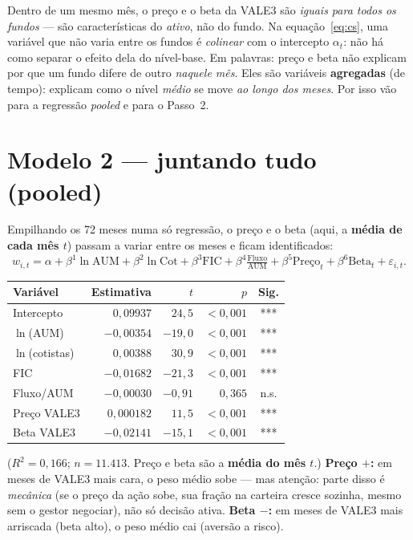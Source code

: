 \documentclass[11pt]{article}
\begin{document}
Dentro de um mesmo mês, o preço e o beta da VALE3 são \emph{iguais para todos os
fundos} --- são características do \emph{ativo}, não do fundo. Na
equação~\eqref{eq:cs}, uma variável que não varia entre os fundos é
\emph{colinear} com o intercepto $\alpha_t$: não há como separar o efeito dela do
nível-base. Em palavras: preço e beta não explicam por que um fundo difere de outro
\emph{naquele mês}. Eles são variáveis \textbf{agregadas} (de tempo): explicam como o
nível \emph{médio} se move \emph{ao longo dos meses}. Por isso vão para a regressão
\emph{pooled} e para o Passo~2.

\section{Modelo 2 --- juntando tudo (pooled)}

Empilhando os 72 meses numa só regressão, o preço e o beta (aqui, a \textbf{média de
cada mês $t$}) passam a variar entre os meses e ficam identificados:
\begin{equation}
w_{i,t} = \alpha + \beta^{1}\ln\text{AUM} + \beta^{2}\ln\text{Cot}
+ \beta^{3}\text{FIC} + \beta^{4}\tfrac{\text{Fluxo}}{\text{AUM}}
+ \beta^{5}\text{Preço}_t + \beta^{6}\text{Beta}_t + \varepsilon_{i,t}.
\label{eq:pool}
\end{equation}

\begin{table}[h]\centering
\begin{tabular}{@{}lrrrc@{}}
\toprule
Variável & Estimativa & $t$ & $p$ & Sig. \\
\midrule
Intercepto       & $0{,}09937$  & $24{,}5$   & $<0{,}001$ & *** \\
$\ln$(AUM)       & $-0{,}00354$ & $-19{,}0$  & $<0{,}001$ & *** \\
$\ln$(cotistas)  & $0{,}00388$  & $30{,}9$   & $<0{,}001$ & *** \\
FIC              & $-0{,}01682$ & $-21{,}3$  & $<0{,}001$ & *** \\
Fluxo/AUM        & $-0{,}00030$ & $-0{,}91$  & $0{,}365$  & n.s. \\
Preço VALE3      & $0{,}000182$ & $11{,}5$   & $<0{,}001$ & *** \\
Beta VALE3       & $-0{,}02141$ & $-15{,}1$  & $<0{,}001$ & *** \\
\bottomrule
\end{tabular}
\end{table}
\noindent ($R^2=0{,}166$; $n=11.413$. Preço e beta são a \textbf{média do mês $t$}.)
\textbf{Preço $+$:} em meses de VALE3 mais cara, o peso médio sobe --- mas atenção: parte
disso é \emph{mecânica} (se o preço da ação sobe, sua fração na carteira cresce sozinha,
mesmo sem o gestor negociar), não só decisão ativa. \textbf{Beta $-$:} em meses de VALE3
mais arriscada (beta alto), o peso médio cai (aversão a risco).
\end{document}
